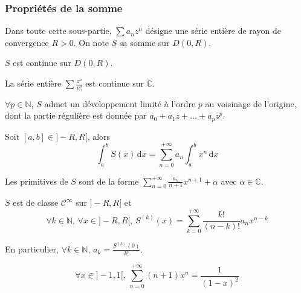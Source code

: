 	\subsubsection{Propriétés de la somme}


	Dans toute cette sous-partie, $\sum a_n z^n$ désigne une série entière de rayon de convergence $R > 0$. On note $S$ sa somme sur $D(0,R)$.

	\begin{proposition}
		$S$ est continue sur $D(0,R)$.
	\end{proposition}

	\begin{example}
		La série entière $\sum \frac{z^n}{n!}$ est continue sur $\mathbb{C}$.
	\end{example}

	\begin{corollary}
		$\forall p \in \mathbb{N}$, $S$ admet un développement limité à l'ordre $p$ au voisinage de l'origine, dont la partie régulière est donnée par $a_0 + a_1z + \dots + a_pz^p$.
	\end{corollary}

	\begin{proposition}
		Soit $[a, b] \in ]-R, R[$, alors
		\[ \int_{a}^{b} S(x) \, \mathrm{d}x = \sum_{n=0}^{+\infty} a_n \int_{a}^{b} x^n \, \mathrm{d}x \]
	\end{proposition}

	\begin{corollary}
		Les primitives de $S$ sont de la forme $\sum_{n=0}^{+\infty} \frac{a_n}{n+1} x^{n+1} + \alpha$ avec $\alpha \in \mathbb{C}$.
	\end{corollary}

	\begin{proposition}
		$S$ est de classe $\mathcal{C}^\infty$ sur $]-R,R[$ et
		\[ \forall k \in \mathbb{N}, \, \forall x \in ]-R,R[, \, S^{(k)}(x) = \sum_{k = 0}^{+\infty} \frac{k!}{(n-k)!} a_n x^{n-k} \]
	\end{proposition}

	\begin{remark}
		En particulier, $\forall k \in \mathbb{N}$, $a_k = \frac{S^{(k)}(0)}{k!}$.
	\end{remark}

	\begin{example}
		\[ \forall x \in ]-1, 1[, \, \sum_{n=0}^{+\infty} (n+1)x^n = \frac{1}{(1-x)^2} \]
	\end{example}

